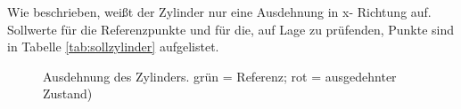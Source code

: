 Wie beschrieben, weißt der Zylinder nur eine Ausdehnung in x- Richtung auf. Sollwerte für die Referenzpunkte und für die, auf Lage zu prüfenden, Punkte sind in Tabelle \ref{tab:sollzylinder} aufgelistet.
\begin{figure}[h]
	\label{fig:zylinderausdehnung}
	\centering
	\caption[Ausdehnung des Zylinders]{Ausdehnung des Zylinders. grün = Referenz; rot = ausgedehnter Zustand)}
\end{figure}

